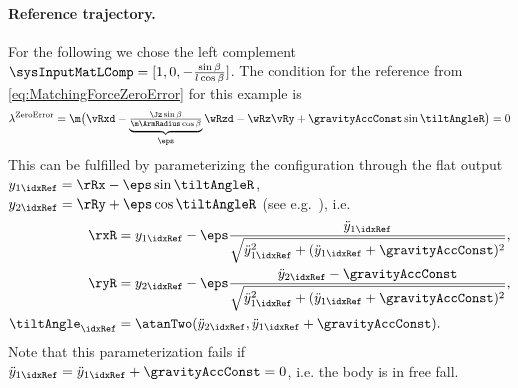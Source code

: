\paragraph{Reference trajectory.}
For the following we chose the left complement $\sysInputMatLComp = [1, 0, -\tfrac{\sin\beta}{l \cos\beta}]$.
The condition for the reference from \eqref{eq:MatchingForceZeroError} for this example is
\begin{align}
 \lambda^{\text{ZeroError}} = \m \big(\vRxd - \underbrace{\tfrac{\Jz \sin\beta}{\m \ArmRadius \cos\beta}}_{\eps} \wRzd - \wRz \vRy + \gravityAccConst \sin\tiltAngleR \big) = 0
\end{align}
This can be fulfilled by parameterizing the configuration through the flat output $y_{1\idxRef} = \rRx - \eps \sin\tiltAngleR$, $y_{2\idxRef} = \rRy + \eps \cos\tiltAngleR$ (see e.g.\ \cite{Fliess:LieBacklund}), i.e.
\begin{align}
 \rxR &= y_{1\idxRef} - \eps \frac{\ddot{y}_{1\idxRef}}{\sqrt{\ddot{y}_{1\idxRef}^2 + (\ddot{y}_{1\idxRef}+\gravityAccConst)^2}},
\\
 \ryR &= y_{2\idxRef} - \eps \frac{\ddot{y}_{2\idxRef}-\gravityAccConst}{\sqrt{\ddot{y}_{1\idxRef}^2 + (\ddot{y}_{1\idxRef}+\gravityAccConst)^2}},
\\
 \tiltAngle_{\idxRef} &= \atanTwo(\ddot{y}_{2\idxRef}, \ddot{y}_{1\idxRef}+\gravityAccConst).
\end{align}
Note that this parameterization fails if $\ddot{y}_{1\idxRef} = \ddot{y}_{1\idxRef}+\gravityAccConst = 0$, i.e. the body is in free fall.


